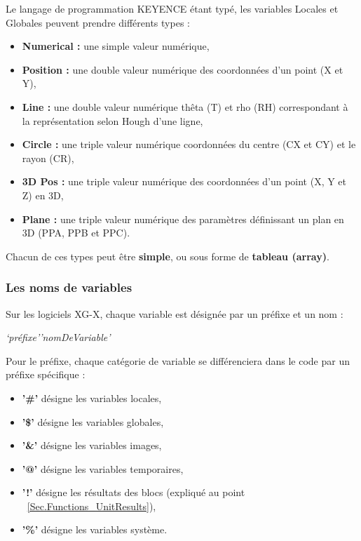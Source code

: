 \vspace{0.2cm}

Le langage de programmation KEYENCE étant typé, les variables Locales et Globales peuvent prendre différents types :
\begin{itemize}
  \item \textbf{Numerical :} une simple valeur numérique,
  \item \textbf{Position :} une double valeur numérique des coordonnées d’un point 
  (X et Y),
  \item \textbf{Line :} une double valeur numérique thêta (T) et rho (RH) correspondant 
  à la représentation selon Hough d’une ligne,
  \item \textbf{Circle :} une triple valeur numérique coordonnées du centre (CX et CY) 
  et le rayon (CR),
  \item \textbf{3D Pos :} une triple valeur numérique des coordonnées d’un point (X, Y 
  et Z) en 3D,
  \item \textbf{Plane :} une triple valeur numérique des paramètres définissant un plan 
  en 3D (PPA, PPB et PPC).
\end{itemize}
Chacun de ces types peut être \textbf{simple}, ou sous forme de \textbf{tableau (array)}.


\subsubsection{Les noms de variables}
\label{Sec.Variables_Names}
\noindent Sur les logiciels XG-X, chaque variable est désignée par un préfixe et un 
nom :
\begin{center}
\textit{‘préfixe’’nomDeVariable’}
\end{center}
\noindent Pour le préfixe, chaque catégorie de variable se différenciera dans le code par un préfixe spécifique :
\begin{itemize}
  \item \textbf{'\#'} désigne les variables locales,
  \item \textbf{'\$'} désigne les variables globales,
  \item \textbf{'\&'} désigne les variables images,
  \item \textbf{'@'} désigne les variables temporaires,
  \item \textbf{'!'} désigne les résultats des blocs (expliqué au point 
  ~\ref{Sec.Functions_UnitResults}),
  \item \textbf{'\%'} désigne les variables système.
\end{itemize}
\vspace{0.2cm}

